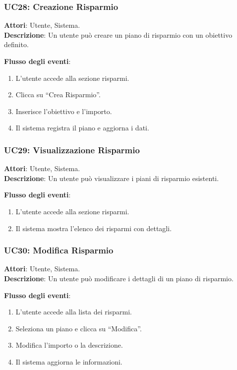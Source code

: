 \subsubsection{UC28: Creazione Risparmio}
\textbf{Attori}: Utente, Sistema. \\
\textbf{Descrizione}: Un utente può creare un piano di risparmio con un obiettivo definito.

\textbf{Flusso degli eventi}:
\begin{enumerate}
    \item L’utente accede alla sezione risparmi.
    \item Clicca su ``Crea Risparmio''.
    \item Inserisce l’obiettivo e l’importo.
    \item Il sistema registra il piano e aggiorna i dati.
\end{enumerate}

\subsubsection{UC29: Visualizzazione Risparmio}
\textbf{Attori}: Utente, Sistema. \\
\textbf{Descrizione}: Un utente può visualizzare i piani di risparmio esistenti.

\textbf{Flusso degli eventi}:
\begin{enumerate}
    \item L’utente accede alla sezione risparmi.
    \item Il sistema mostra l’elenco dei risparmi con dettagli.
\end{enumerate}

\subsubsection{UC30: Modifica Risparmio}
\textbf{Attori}: Utente, Sistema. \\
\textbf{Descrizione}: Un utente può modificare i dettagli di un piano di risparmio.

\textbf{Flusso degli eventi}:
\begin{enumerate}
    \item L’utente accede alla lista dei risparmi.
    \item Seleziona un piano e clicca su ``Modifica''.
    \item Modifica l’importo o la descrizione.
    \item Il sistema aggiorna le informazioni.
\end{enumerate}

